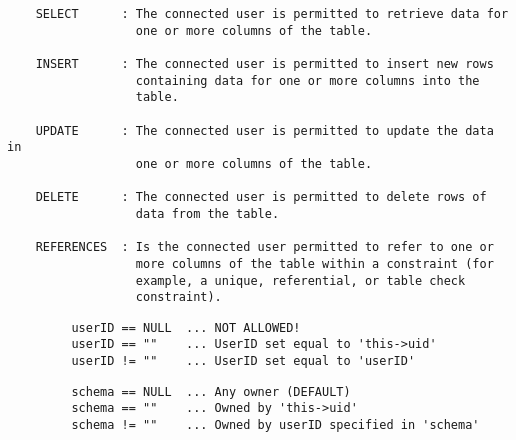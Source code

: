 \begin{verbatim}
    SELECT      : The connected user is permitted to retrieve data for
                  one or more columns of the table.

    INSERT      : The connected user is permitted to insert new rows
                  containing data for one or more columns into the
                  table.

    UPDATE      : The connected user is permitted to update the data in
                  one or more columns of the table.

    DELETE      : The connected user is permitted to delete rows of
                  data from the table.

    REFERENCES  : Is the connected user permitted to refer to one or
                  more columns of the table within a constraint (for
                  example, a unique, referential, or table check
                  constraint).
\end{verbatim}
\begin{verbatim}
         userID == NULL  ... NOT ALLOWED!
         userID == ""    ... UserID set equal to 'this->uid'
         userID != ""    ... UserID set equal to 'userID'
\end{verbatim}

\begin{verbatim}
         schema == NULL  ... Any owner (DEFAULT)
         schema == ""    ... Owned by 'this->uid'
         schema != ""    ... Owned by userID specified in 'schema'
\end{verbatim}



